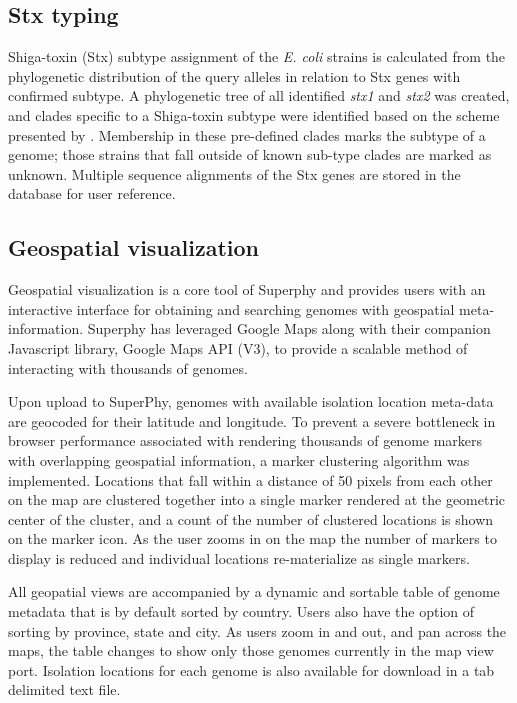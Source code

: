 \documentclass{bmcart}
\begin{document}
\subsection{Stx typing}
Shiga-toxin (Stx) subtype assignment of the \textit{E. coli} strains is calculated from the phylogenetic distribution of the query alleles in relation to Stx genes with confirmed subtype. A phylogenetic tree of all identified \textit{stx1} and \textit{stx2} was created, and clades specific to a Shiga-toxin subtype were identified based on the scheme presented by \cite{scheutz_multicenter_2012}. Membership in these pre-defined clades marks the subtype of a genome; those strains that fall outside of known sub-type clades are marked as unknown. Multiple sequence alignments of the Stx genes are stored in the database for user reference.

\subsection{Geospatial visualization}
Geospatial visualization is a core tool of Superphy and provides users with an interactive interface for obtaining and searching genomes with geospatial meta-information. Superphy has leveraged Google Maps along with their companion Javascript library, Google Maps API (V3), to provide a scalable method of interacting with thousands of genomes. 

Upon upload to SuperPhy, genomes with available isolation location meta-data are geocoded for their latitude and longitude. To prevent a severe bottleneck in browser performance associated with rendering thousands of genome markers with overlapping geospatial information, a marker clustering algorithm was implemented. Locations that fall within a distance of 50 pixels from each other on the map are clustered together into a single marker rendered at the geometric center of the cluster, and a count of the number of clustered locations is shown on the marker icon. As the user zooms in on the map the number of markers to display is reduced and individual locations re-materialize as single markers. 

All geopatial views are accompanied by a dynamic and sortable table of genome metadata that is by default sorted by country. Users also have the option of sorting by province, state and city. As users zoom in and out, and pan across the maps, the table changes to show only those genomes currently in the map view port. Isolation locations for each genome is also available for download in a tab delimited text file.
\end{document}
